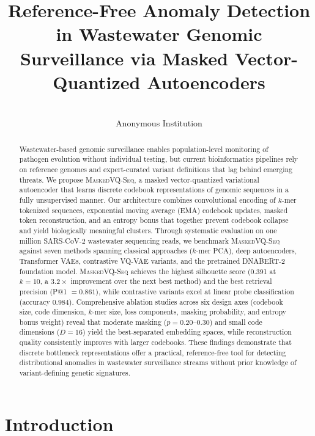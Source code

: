 \documentclass[pmlr]{jmlr}%
\title[Reference-Free Anomaly Detection in Wastewater Genomic Surveillance]{%
Reference-Free Anomaly Detection in Wastewater Genomic Surveillance via Masked Vector-Quantized Autoencoders}
\author{\Name{Anonymous Authors}
        \Email{anonymous@anonymous.org}\\
        \addr Anonymous Institution}
\newcommand{\ours}{\textsc{MaskedVQ-Seq}}
\begin{document}
\maketitle

\begin{abstract}
Wastewater-based genomic surveillance enables population-level monitoring of pathogen evolution without individual testing, but current bioinformatics pipelines rely on reference genomes and expert-curated variant definitions that lag behind emerging threats. We propose \ours{}, a masked vector-quantized variational autoencoder that learns discrete codebook representations of genomic sequences in a fully unsupervised manner. Our architecture combines convolutional encoding of $k$-mer tokenized sequences, exponential moving average (EMA) codebook updates, masked token reconstruction, and an entropy bonus that together prevent codebook collapse and yield biologically meaningful clusters. Through systematic evaluation on one million SARS-CoV-2 wastewater sequencing reads, we benchmark \ours{} against seven methods spanning classical approaches ($k$-mer PCA), deep autoencoders, Transformer VAEs, contrastive VQ-VAE variants, and the pretrained DNABERT-2 foundation model. \ours{} achieves the highest silhouette score (0.391 at $k{=}10$, a $3.2\times$ improvement over the next best method) and the best retrieval precision (P@1 $= 0.861$), while contrastive variants excel at linear probe classification (accuracy $0.984$). Comprehensive ablation studies across six design axes (codebook size, code dimension, $k$-mer size, loss components, masking probability, and entropy bonus weight) reveal that moderate masking ($p{=}0.20$--$0.30$) and small code dimensions ($D{=}16$) yield the best-separated embedding spaces, while reconstruction quality consistently improves with larger codebooks. These findings demonstrate that discrete bottleneck representations offer a practical, reference-free tool for detecting distributional anomalies in wastewater surveillance streams without prior knowledge of variant-defining genetic signatures.
\end{abstract}

\section{Introduction}
\label{sec:intro}
\end{document}
